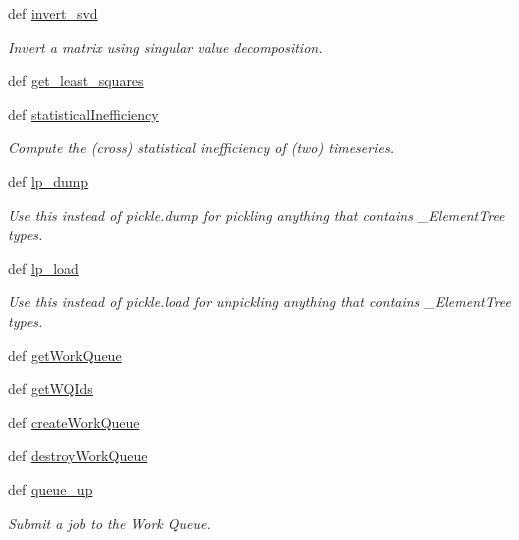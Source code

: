\begin{DoxyCompactItemize}
def \hyperlink{namespaceforcebalance_1_1nifty_a4c82187e92dfeb8a159f4aa44b501c40}{invert\-\_\-svd}
\begin{DoxyCompactList}\small\item\em \-Invert a matrix using singular value decomposition. \end{DoxyCompactList}\item 
def \hyperlink{namespaceforcebalance_1_1nifty_aa9fb9c7c65231eca50a7afc04f489b64}{get\-\_\-least\-\_\-squares}
\item 
def \hyperlink{namespaceforcebalance_1_1nifty_ad5ca60565c864b4245a8212fe9d92e10}{statistical\-Inefficiency}
\begin{DoxyCompactList}\small\item\em \-Compute the (cross) statistical inefficiency of (two) timeseries. \end{DoxyCompactList}\item 
def \hyperlink{namespaceforcebalance_1_1nifty_a2ff762a2f2d2b6bb1c7dd067bd1a1e88}{lp\-\_\-dump}
\begin{DoxyCompactList}\small\item\em \-Use this instead of pickle.\-dump for pickling anything that contains \-\_\-\-Element\-Tree types. \end{DoxyCompactList}\item 
def \hyperlink{namespaceforcebalance_1_1nifty_a577abfd36638c5f4dfdade136abaef12}{lp\-\_\-load}
\begin{DoxyCompactList}\small\item\em \-Use this instead of pickle.\-load for unpickling anything that contains \-\_\-\-Element\-Tree types. \end{DoxyCompactList}\item 
def \hyperlink{namespaceforcebalance_1_1nifty_ac37d4fe58ef70ed546ebfc45d12f7a5d}{get\-Work\-Queue}
\item 
def \hyperlink{namespaceforcebalance_1_1nifty_abe1e72c32252d62a6551b47290c7584f}{get\-W\-Q\-Ids}
\item 
def \hyperlink{namespaceforcebalance_1_1nifty_ab5f3072ad95e9c75659cb1adac341051}{create\-Work\-Queue}
\item 
def \hyperlink{namespaceforcebalance_1_1nifty_a09605ee2819749913bbbb6206af1af70}{destroy\-Work\-Queue}
\item 
def \hyperlink{namespaceforcebalance_1_1nifty_a673f4a044169f5d8d822823989a836a7}{queue\-\_\-up}
\begin{DoxyCompactList}\small\item\em \-Submit a job to the \-Work \-Queue. \end{DoxyCompactList}\item 

\end{DoxyCompactItemize}

